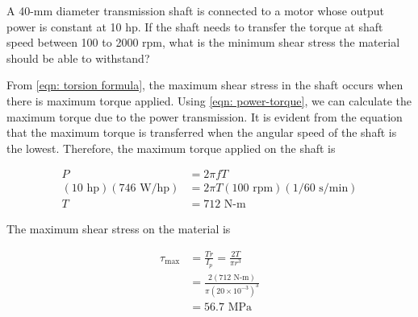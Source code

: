 \documentclass[
10pt,
a4paper,
openany,
svgnames,
]{kaobook} %
\begin{document}
\begin{example}
  A 40-mm diameter transmission shaft is connected to a motor whose output power is constant at 10 hp.  If the shaft needs to transfer the torque at shaft speed between 100 to 2000 rpm, what is the minimum shear stress the material should be able to withstand?
  
    \begin{figure}[H]
    \centering
  \end{figure}
  
\end{example}
\begin{solution}
From \cref{eqn: torsion formula}, the maximum shear stress in the shaft occurs when there is maximum torque applied. Using \cref{eqn: power-torque}, we can calculate the maximum torque due to the power transmission. It is evident from the equation that the maximum torque is transferred when the angular speed of the shaft is the lowest. Therefore, the maximum torque applied on the shaft is

\begin{align*}
  P &= 2\pi fT \\ 
  (10 \text{ hp})(746 \text{ W/hp}) &= 2\pi T (100 \text{ rpm})(1/60 \text{ s/min}) \\ 
  T &= 712 \text{ N-m}
\end{align*}	

The maximum shear stress on the material is

\begin{align*}
  {\tau _{\max }} &= \frac{{Tr}}{{{I_p}}} = \frac{{2T}}{{\pi {r^3}}} \\[5pt]
                  &= \frac{2(712 \text{ N-m})}{\pi (20 \times 10^{ - 3})^3} \\[5pt]
                  &= 56.7 \text{ MPa}  
\end{align*}
\end{solution}
\end{document}
